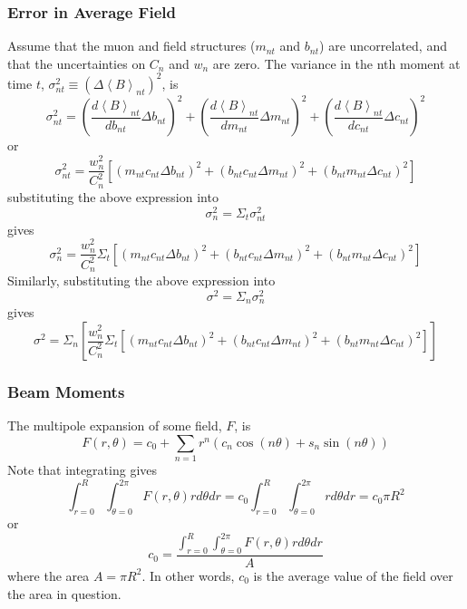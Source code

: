 \documentclass[twoside]{article}
\begin{document}
\subsubsection{Error in Average Field}
Assume that the muon and field structures ($m_{nt}$ and $b_{nt}$) are uncorrelated, and that the uncertainties on $C_n$ and $w_n$ are zero. The variance in the nth moment at time $t$, $\sigma^2_{nt} \equiv (\Delta \left\langle B \right\rangle_{nt})^2$, is 
\begin{equation}
\sigma^2_{nt} =
(\frac{d \left\langle B \right\rangle_{nt}}{db_{nt}}\Delta b_{nt})^2 +
(\frac{d \left\langle B \right\rangle_{nt}}{dm_{nt}}\Delta m_{nt})^2 + 
(\frac{d \left\langle B \right\rangle_{nt}}{dc_{nt}}\Delta c_{nt})^2 
\end{equation}
or 
\begin{equation}
\boxed{
\sigma^2_{nt} =
\frac{w^2_n}{C^2_n}[(m_{nt} c_{nt} \Delta b_{nt})^2 + (b_{nt} c_{nt} \Delta m_{nt})^2  + (b_{nt} m_{nt} \Delta c_{nt})^2 ]
}
\end{equation}
substituting the above expression into
\begin{equation}
\sigma^2_{n} = \Sigma_t  \sigma^2_{nt} 
\end{equation}
gives 
\begin{equation}
\boxed{
\sigma^2_{n} = \frac{w^2_n}{C^2_n} \Sigma_t  [(m_{nt} c_{nt} \Delta b_{nt})^2 + (b_{nt} c_{nt} \Delta m_{nt})^2  + (b_{nt} m_{nt} \Delta c_{nt})^2 ]
}
\end{equation}
Similarly, substituting the above expression into
\begin{equation}
\sigma^2 = \Sigma_n  \sigma^2_{n} 
\end{equation}
gives
\begin{equation}
\boxed{
	\sigma^2 = \Sigma_n [\frac{w^2_n}{C^2_n} \Sigma_t  [(m_{nt} c_{nt} \Delta b_{nt})^2 + (b_{nt} c_{nt} \Delta m_{nt})^2  + (b_{nt} m_{nt} \Delta c_{nt})^2 ]]
}
\end{equation}




\subsubsection{Beam Moments}
The multipole expansion of some field, $F$, is
\begin{equation}
F(r,\theta) =   c_0 +  \sum_{n=1} r^{n} (c_{n} \cos(n \theta)  + s_{n} \sin(n \theta )   )
\end{equation}
Note that integrating gives
\begin{equation}
\int^{R}_{r = 0} \int^{2\pi}_{\theta = 0} F(r,\theta) r d\theta dr =    
c_0 \int^{R}_{r = 0} \int^{2\pi}_{\theta = 0}  r d\theta dr = 
c_0 \pi R^2
\end{equation}
or 
\begin{equation}
\boxed{
c_0 = \frac{\int^{R}_{r = 0} \int^{2\pi}_{\theta = 0} F(r,\theta) r d\theta dr}{A}
}
\end{equation}
where the area $A = \pi R^2$. In other words, $c_0$ is the average value of the field over the area in question.
\end{document}
